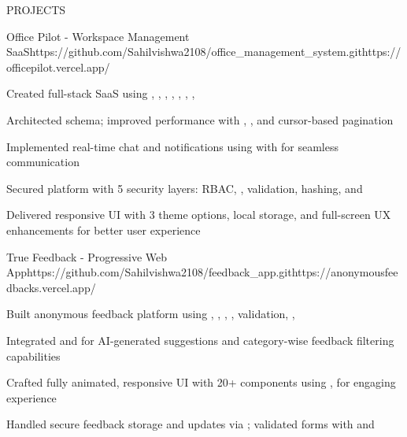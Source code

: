\documentclass{resume}
\begin{document}
\begin{rSection}{PROJECTS}

\begin{rProject}{Office Pilot - Workspace Management SaaS}{https://github.com/Sahilvishwa2108/office_management_system.git}{https://officepilot.vercel.app/}
\item Created full-stack SaaS using , , , , , , , 
\item Architected  schema; improved performance with , , and cursor-based pagination
\item Implemented real-time chat and notifications using  with  for seamless communication
\item Secured platform with 5 security layers: RBAC, ,  validation,  hashing, and 
\item Delivered responsive UI with 3 theme options, local storage, and full-screen UX enhancements for better user experience
\end{rProject}

\begin{rProject}{True Feedback - Progressive Web App}{https://github.com/Sahilvishwa2108/feedback_app.git}{https://anonymousfeedbacks.vercel.app/}
\item Built anonymous feedback platform using , , , ,  validation, , 
\item Integrated  and  for AI-generated suggestions and category-wise feedback filtering capabilities
\item Crafted fully animated, responsive UI with 20+ components using ,  for engaging experience
\item Handled secure feedback storage and updates via ; validated forms with  and 
\end{rProject}


\end{rSection}
\end{document}
